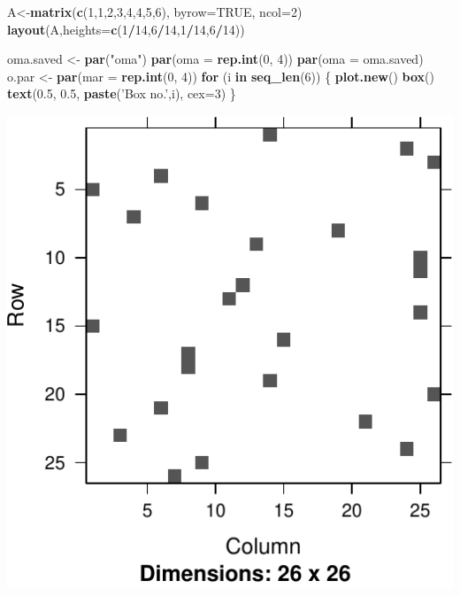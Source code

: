 \documentclass[]{book}
\newenvironment{Shaded}{\begin{snugshade}}{\end{snugshade}}
\newcommand{\ControlFlowTok}[1]{\textcolor[rgb]{0.13,0.29,0.53}{\textbf{#1}}}
\newcommand{\DataTypeTok}[1]{\textcolor[rgb]{0.13,0.29,0.53}{#1}}
\newcommand{\DecValTok}[1]{\textcolor[rgb]{0.00,0.00,0.81}{#1}}
\newcommand{\FloatTok}[1]{\textcolor[rgb]{0.00,0.00,0.81}{#1}}
\newcommand{\KeywordTok}[1]{\textcolor[rgb]{0.13,0.29,0.53}{\textbf{#1}}}
\newcommand{\NormalTok}[1]{#1}
\newcommand{\OperatorTok}[1]{\textcolor[rgb]{0.81,0.36,0.00}{\textbf{#1}}}
\newcommand{\OtherTok}[1]{\textcolor[rgb]{0.56,0.35,0.01}{#1}}
\newcommand{\StringTok}[1]{\textcolor[rgb]{0.31,0.60,0.02}{#1}}
\theoremstyle{definition}
\theoremstyle{definition}
\theoremstyle{definition}
\theoremstyle{remark}
\begin{document}
\begin{Shaded}
\begin{Highlighting}[]
\NormalTok{A<-}\KeywordTok{matrix}\NormalTok{(}\KeywordTok{c}\NormalTok{(}\DecValTok{1}\NormalTok{,}\DecValTok{1}\NormalTok{,}\DecValTok{2}\NormalTok{,}\DecValTok{3}\NormalTok{,}\DecValTok{4}\NormalTok{,}\DecValTok{4}\NormalTok{,}\DecValTok{5}\NormalTok{,}\DecValTok{6}\NormalTok{), }\DataTypeTok{byrow=}\OtherTok{TRUE}\NormalTok{, }\DataTypeTok{ncol=}\DecValTok{2}\NormalTok{)}
\KeywordTok{layout}\NormalTok{(A,}\DataTypeTok{heights=}\KeywordTok{c}\NormalTok{(}\DecValTok{1}\OperatorTok{/}\DecValTok{14}\NormalTok{,}\DecValTok{6}\OperatorTok{/}\DecValTok{14}\NormalTok{,}\DecValTok{1}\OperatorTok{/}\DecValTok{14}\NormalTok{,}\DecValTok{6}\OperatorTok{/}\DecValTok{14}\NormalTok{))}

\NormalTok{oma.saved <-}\StringTok{ }\KeywordTok{par}\NormalTok{(}\StringTok{"oma"}\NormalTok{)}
\KeywordTok{par}\NormalTok{(}\DataTypeTok{oma =} \KeywordTok{rep.int}\NormalTok{(}\DecValTok{0}\NormalTok{, }\DecValTok{4}\NormalTok{))}
\KeywordTok{par}\NormalTok{(}\DataTypeTok{oma =}\NormalTok{ oma.saved)}
\NormalTok{o.par <-}\StringTok{ }\KeywordTok{par}\NormalTok{(}\DataTypeTok{mar =} \KeywordTok{rep.int}\NormalTok{(}\DecValTok{0}\NormalTok{, }\DecValTok{4}\NormalTok{))}
\ControlFlowTok{for}\NormalTok{ (i }\ControlFlowTok{in} \KeywordTok{seq_len}\NormalTok{(}\DecValTok{6}\NormalTok{)) \{}
    \KeywordTok{plot.new}\NormalTok{()}
    \KeywordTok{box}\NormalTok{()}
    \KeywordTok{text}\NormalTok{(}\FloatTok{0.5}\NormalTok{, }\FloatTok{0.5}\NormalTok{, }\KeywordTok{paste}\NormalTok{(}\StringTok{'Box no.'}\NormalTok{,i), }\DataTypeTok{cex=}\DecValTok{3}\NormalTok{)}
\NormalTok{\}}
\end{Highlighting}
\end{Shaded}

\includegraphics[width=0.5\linewidth]{Rcourse_files/figure-latex/unnamed-chunk-272-1}
\end{document}
